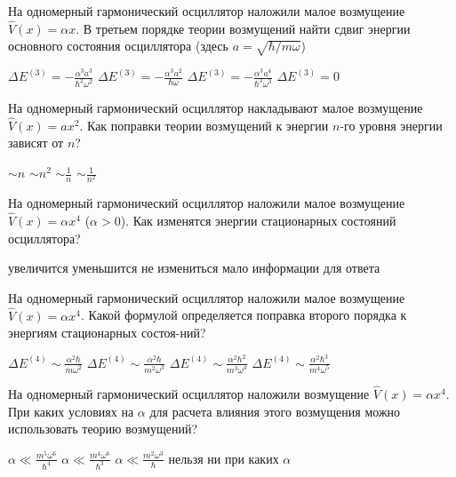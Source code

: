 \documentclass[11pt,a4paper]{exam}
\begin{document}
\begin{questions}
\question На одномерный гармонический осциллятор наложили малое возмущение $\hat V(x) = \alpha x$. В третьем порядке теории возмущений найти сдвиг энергии основного состояния осциллятора (здесь $a = \sqrt {\hbar /m\omega } $)
\begin{choices}
\choice $\Delta {E^{(3)}} =  - \frac{{{\alpha ^3}{a^3}}}{{{\hbar ^2}{\omega ^2}}}$ 
\choice $\Delta {E^{(3)}} =  - \frac{{{\alpha ^3}{a^2}}}{{\hbar \omega }}$   
\choice $\Delta {E^{(3)}} =  - \frac{{{\alpha ^3}{a^4}}}{{{\hbar ^3}{\omega ^3}}}$ 
\choice $\Delta {E^{(3)}} = 0$
\end{choices}

\question На одномерный гармонический осциллятор накладывают малое возмущение $\hat V(x) = a{x^2}$. Как поправки теории возмущений к энергии $n$-го уровня энергии зависят от $n$?
\begin{choices}
\choice $ \sim n$    
\choice $ \sim {n^2}$     
\choice $ \sim \frac{1}{n}$     
\choice $ \sim \frac{1}{{{n^2}}}$
\end{choices}

\question На одномерный гармонический осциллятор наложили малое возмущение $\hat V(x) = \alpha {x^4}$ ($\alpha  > 0$). Как изменятся энергии стационарных состояний осциллятора?
\begin{choices}
\choice увеличится  
\choice уменьшится  
\choice не измениться  
\choice мало информации для ответа
\end{choices}

\question На одномерный гармонический осциллятор наложили малое возмущение $\hat V(x) = \alpha {x^4}$. Какой формулой определяется поправка второго порядка к энергиям стационарных состоя-ний?
\begin{choices}
\choice $\Delta {E^{(4)}} \sim \frac{{{\alpha ^2}\hbar }}{{m{\omega ^2}}}$   
\choice $\Delta {E^{(4)}} \sim \frac{{{\alpha ^2}\hbar }}{{{m^2}{\omega ^3}}}$  
\choice $\Delta {E^{(4)}} \sim \frac{{{\alpha ^2}{\hbar ^2}}}{{{m^3}{\omega ^4}}}$ 
\choice $\Delta {E^{(4)}} \sim \frac{{{\alpha ^2}{\hbar ^3}}}{{{m^4}{\omega ^5}}}$
\end{choices}

\question На одномерный гармонический осциллятор наложили возмущение $\hat V(x) = \alpha {x^4}$. При каких условиях на $\alpha $ для расчета влияния этого возмущения можно использовать теорию возмущений?
\begin{choices}
\choice $\alpha  \ll \frac{{{m^5}{\omega ^6}}}{{{\hbar ^4}}}$    
\choice $\alpha  \ll \frac{{{m^4}{\omega ^6}}}{{{\hbar ^3}}}$    
\choice $\alpha  \ll \frac{{{m^2}{\omega ^3}}}{\hbar }$    
\choice нельзя ни при каких $\alpha $
\end{choices}


\end{questions}
\end{document}
